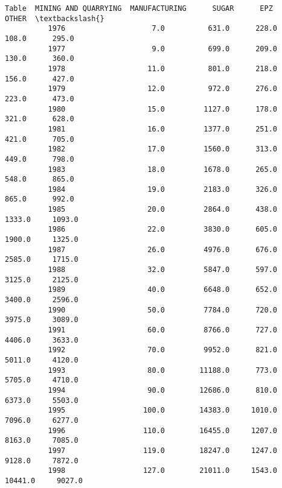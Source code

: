 \documentclass[11pt]{article}
\begin{document}
\begin{Verbatim}[commandchars=\\\{\}]
          Table  MINING AND QUARRYING  MANUFACTURING      SUGAR      EPZ       OTHER  \textbackslash{}
          1976                    7.0          631.0      228.0     108.0      295.0   
          1977                    9.0          699.0      209.0     130.0      360.0   
          1978                   11.0          801.0      218.0     156.0      427.0   
          1979                   12.0          972.0      276.0     223.0      473.0   
          1980                   15.0         1127.0      178.0     321.0      628.0   
          1981                   16.0         1377.0      251.0     421.0      705.0   
          1982                   17.0         1560.0      313.0     449.0      798.0   
          1983                   18.0         1678.0      265.0     548.0      865.0   
          1984                   19.0         2183.0      326.0     865.0      992.0   
          1985                   20.0         2864.0      438.0    1333.0     1093.0   
          1986                   22.0         3830.0      605.0    1900.0     1325.0   
          1987                   26.0         4976.0      676.0    2585.0     1715.0   
          1988                   32.0         5847.0      597.0    3125.0     2125.0   
          1989                   40.0         6648.0      652.0    3400.0     2596.0   
          1990                   50.0         7784.0      720.0    3975.0     3089.0   
          1991                   60.0         8766.0      727.0    4406.0     3633.0   
          1992                   70.0         9952.0      821.0    5011.0     4120.0   
          1993                   80.0        11188.0      773.0    5705.0     4710.0   
          1994                   90.0        12686.0      810.0    6373.0     5503.0   
          1995                  100.0        14383.0     1010.0    7096.0     6277.0   
          1996                  110.0        16455.0     1207.0    8163.0     7085.0   
          1997                  119.0        18247.0     1247.0    9128.0     7872.0   
          1998                  127.0        21011.0     1543.0   10441.0     9027.0   
          

\end{Verbatim}
\end{document}
